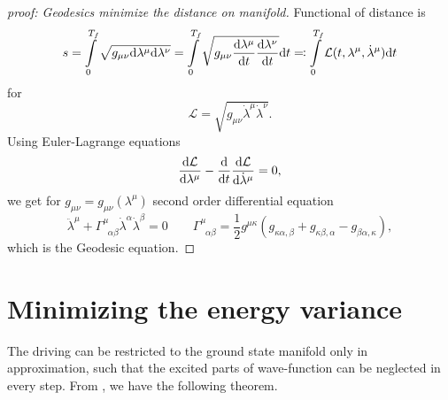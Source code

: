 \begin{proof}[proof: Geodesics minimize the distance on manifold]
    Functional of distance is
    \begin{equation}
        s=\int\limits_0^{T_f} \sqrt{g_{\mu\nu}\mathrm{d}\lambda^\mu\mathrm{d}\lambda^\nu}=\int\limits_0^{T_f} \sqrt{g_{\mu\nu}\frac{\mathrm{d} \lambda^\mu}{\mathrm{d} t}\frac{\mathrm{d} \lambda^\nu}{\mathrm{d} t}}\mathrm{d} t \eqqcolon \int\limits_0^{T_f} \mathcal{L}(t,\lambda^\mu,\dot\lambda^\mu)\mathrm{d} t
    \end{equation}
    for 
    \begin{equation}
        \mathcal{L}=\sqrt{g_{\mu\nu}\dot\lambda^\mu\dot\lambda^\nu}.
    \end{equation}
    Using Euler-Lagrange equations 
    \begin{equation}
        \frac{\mathrm{d} \mathcal{L}}{\mathrm{d} \lambda^\mu}-\frac{\mathrm{d} }{\mathrm{d} t}\frac{\mathrm{d} \mathcal{L}}{\mathrm{d} \dot\lambda^\mu}=0,
    \end{equation}
    we get for $g_{\mu\nu}=g_{\mu\nu}(\lambda^\mu)$ second order differential equation
    \begin{equation}
        \ddot\lambda^\mu+\Gamma^\mu_{\;\;\alpha\beta}\dot\lambda^\alpha\dot\lambda^\beta=0\qquad \Gamma^\mu_{\;\;\alpha\beta}=\frac{1}{2}g^{\mu\kappa}\left(g_{\kappa\alpha,\beta}+g_{\kappa\beta,\alpha}-g_{\beta\alpha,\kappa}\right),
        \label{eq:geodesicEquaiton}
    \end{equation}
    which is the Geodesic equation.
\end{proof}











\section{Minimizing the energy variance}
The driving can be restricted to the ground state manifold only in approximation, such that the excited parts of wave-function can be neglected in every step. From \cite{Bukov2019}, we have the following theorem.

